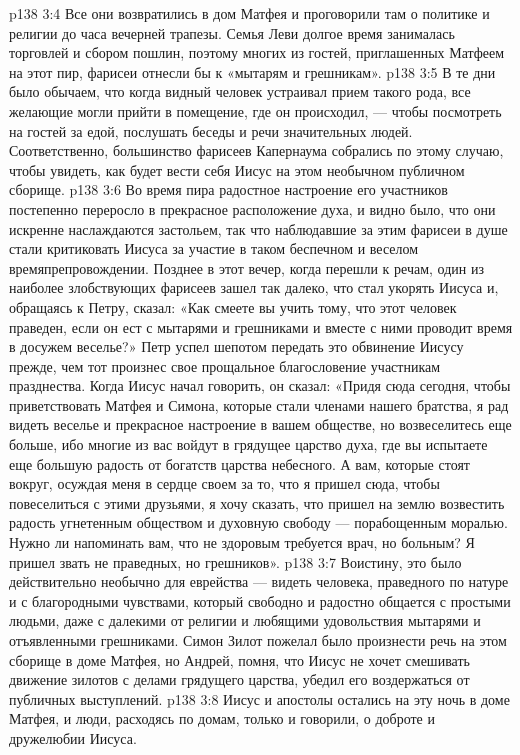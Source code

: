 \vs p138 3:4 \pc Все они возвратились в дом Матфея и проговорили там о политике и религии до часа вечерней трапезы. Семья Леви долгое время занималась торговлей и сбором пошлин, поэтому многих из гостей, приглашенных Матфеем на этот пир, фарисеи отнесли бы к «мытарям и грешникам».
\vs p138 3:5 В те дни было обычаем, что когда видный человек устраивал прием такого рода, все желающие могли прийти в помещение, где он происходил, --- чтобы посмотреть на гостей за едой, послушать беседы и речи значительных людей. Соответственно, большинство фарисеев Капернаума собрались по этому случаю, чтобы увидеть, как будет вести себя Иисус на этом необычном публичном сборище.
\vs p138 3:6 Во время пира радостное настроение его участников постепенно переросло в прекрасное расположение духа, и видно было, что они искренне наслаждаются застольем, так что наблюдавшие за этим фарисеи в душе стали критиковать Иисуса за участие в таком беспечном и веселом времяпрепровождении. Позднее в этот вечер, когда перешли к речам, один из наиболее злобствующих фарисеев зашел так далеко, что стал укорять Иисуса и, обращаясь к Петру, сказал: «Как смеете вы учить тому, что этот человек праведен, если он ест с мытарями и грешниками и вместе с ними проводит время в досужем веселье?» Петр успел шепотом передать это обвинение Иисусу прежде, чем тот произнес свое прощальное благословение участникам празднества. Когда Иисус начал говорить, он сказал: «Придя сюда сегодня, чтобы приветствовать Матфея и Симона, которые стали членами нашего братства, я рад видеть веселье и прекрасное настроение в вашем обществе, но возвеселитесь еще больше, ибо многие из вас войдут в грядущее царство духа, где вы испытаете еще большую радость от богатств царства небесного. А вам, которые стоят вокруг, осуждая меня в сердце своем за то, что я пришел сюда, чтобы повеселиться с этими друзьями, я хочу сказать, что пришел на землю возвестить радость угнетенным обществом и духовную свободу --- порабощенным моралью. Нужно ли напоминать вам, что не здоровым требуется врач, но больным? Я пришел звать не праведных, но грешников».
\vs p138 3:7 Воистину, это было действительно необычно для еврейства --- видеть человека, праведного по натуре и с благородными чувствами, который свободно и радостно общается с простыми людьми, даже с далекими от религии и любящими удовольствия мытарями и отъявленными грешниками. Симон Зилот пожелал было произнести речь на этом сборище в доме Матфея, но Андрей, помня, что Иисус не хочет смешивать движение зилотов с делами грядущего царства, убедил его воздержаться от публичных выступлений.
\vs p138 3:8 Иисус и апостолы остались на эту ночь в доме Матфея, и люди, расходясь по домам, только и говорили, о доброте и дружелюбии Иисуса.
